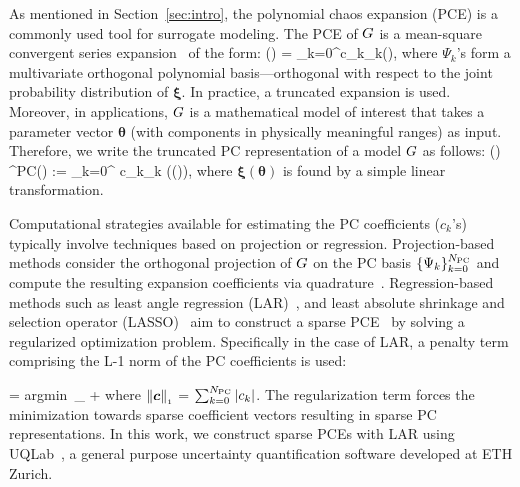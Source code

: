 
As mentioned in Section~\ref{sec:intro}, the 
polynomial chaos expansion
(PCE) is a commonly used tool for surrogate modeling. 
The PCE of
$G$ is a mean-square 
convergent series expansion~\cite{Xiu:2002,Ghanem:2003,Olivier:2010} of the form:
\be
\GG(\bm\xi) = \sum_{k=0}^\infty c_k\Psi_k(\bm{\xi}),
\ee
where $\Psi_k$'s form a multivariate orthogonal polynomial
basis---orthogonal with respect to the joint probability distribution of $\bm{\xi}$.
%
In practice, a truncated expansion is used.  Moreover, in applications, $G$
is a mathematical model of interest that takes a parameter vector $\bm{\theta}$
(with components in physically meaningful ranges) as input. Therefore, we 
write the truncated PC representation of a model $G$ as follows:
\be 
\GG(\bm\theta) \approx \GG^{\mbox{\tiny PC}}(\bm\theta) := \sum_{k=0}^{\Npc}
c_k\Psi_k (\bm\xi(\bm\theta)), 
\ee
where $\bm\xi(\bm\theta)$ is found by a simple linear transformation.

Computational strategies available for estimating the PC coefficients
($c_k$'s) typically involve techniques based on projection or regression.
Projection-based methods consider the orthogonal projection of 
$G$ on the PC basis $\{\Psi_k\}_{k=0}^{N_\text{PC}}$ and compute
the resulting expansion coefficients via quadrature~\cite{Olivier:2010}.
Regression-based methods such as least angle regression (LAR)~\cite{Efron:2004}, and least absolute shrinkage
and selection operator (LASSO)~\cite{Tibshirani:1996} aim to construct a sparse PCE~\cite{Blatman:2008}
by solving a regularized optimization problem. Specifically in the case of LAR, a penalty term comprising the L-1
norm of the PC coefficients is used:

\be
{} = \mbox{argmin}~_{\bm\theta}
\left[\left(\sum_{k=0}^\Npc c_k \Psi_k(\bm\xi(\bm\theta)) -
\GG(\bm{\theta})\right)^{2}\right]  + \lambda{}
\label{eq:reg}
\ee
where $\left\| {\bm{c}} \right\|_{\scriptscriptstyle 1}$ = $\sum_{k=0}^{N_\text{PC}} |c_k |$.
The regularization term forces the minimization towards sparse coefficient vectors resulting
in sparse PC representations.
In this work, we construct sparse PCEs with LAR using UQLab~\cite{Marelli:2014},
a general purpose uncertainty quantification software developed at ETH Zurich.



















